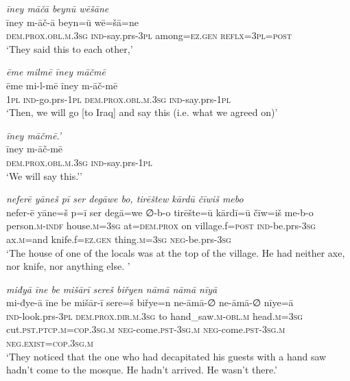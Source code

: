 \ea \label{BP.66}
\textit{īney māčā beynū wēšāne} \\ 
\gll īney m-āč-ā beyn=ū wē=šā=ne \\ 
 \textsc{dem.prox}\textsc{.obl}\textsc{.m}\textsc{.3sg} \textsc{ind-}say.prs\textsc{-3pl} among\textsc{=ez.gen} \textsc{reflx}\textsc{=3pl}\textsc{=\textsc{post}} \\ 
\glt `They said this to each other,'
\z 
 
\ea \label{BP.68}
\textit{ēme milmē īney māčmē} \\ 
\gll ēme mi-l-mē īney m-āč-mē \\ 
 \textsc{1pl} \textsc{ind-}go.prs\textsc{-\textsc{1pl}} \textsc{dem.prox}\textsc{.obl}\textsc{.m}\textsc{.3sg} \textsc{ind-}say.prs\textsc{-\textsc{1pl}} \\ 
\glt `Then, we will go [to Iraq] and say this (i.e. what we agreed on)'
\z 
 
\ea \label{BP.69}
\textit{īney māčmē.’} \\ 
\gll īney m-āč-mē \\ 
 \textsc{dem.prox}\textsc{.obl}\textsc{.m}\textsc{.3sg} \textsc{ind-}say.prs\textsc{-\textsc{1pl}} \\ 
\glt `We will say this.’'
\z 
 
\ea \label{BP.71}
\textit{neferē yāneš pī ser degāwe bo, tirēštew kārdū čīwiš mebo} \\ 
\gll nefer-ē yāne=š p=ī ser degā=we ∅-b-o tirēšte=ū kārdī=ū čīw=iš me-b-o \\ 
 person\textsc{.m}\textsc{-indf} house\textsc{.m}\textsc{=3sg} at=\textsc{dem.prox} on village.f\textsc{=\textsc{post}} \textsc{ind-}be.prs\textsc{-3sg} ax\textsc{.m}=and knife.f\textsc{=ez.gen} thing\textsc{.m}\textsc{=3sg} \textsc{neg-}be.prs\textsc{-3sg} \\ 
\glt `The house of one of the locals was at the top of the village. He had neither axe, nor knife, nor anything else. '
\z 
 
\ea \label{BP.76}
\textit{miđyā īne be mišārī sereš biřyen nāmā nāmā nīyā} \\ 
\gll mi-đye-ā īne be mišār-ī sere=š biřye=n ne-āmā-∅ ne-āmā-∅ nīye=ā \\ 
 \textsc{ind-}look.prs\textsc{-3pl} \textsc{dem.prox}\textsc{.dir}\textsc{.m}\textsc{.3sg} to hand\_saw\textsc{.m}\textsc{-obl}\textsc{.m} head\textsc{.m}\textsc{=3sg} cut\textsc{.pst}\textsc{.ptcp}\textsc{.m}\textsc{=cop}\textsc{.3sg}\textsc{.m} \textsc{neg-}come\textsc{.pst}\textsc{-3sg}\textsc{.m} \textsc{neg-}come\textsc{.pst}\textsc{-3sg}\textsc{.m} \textsc{\textsc{neg.}exist}\textsc{=cop}\textsc{.3sg}\textsc{.m} \\ 
\glt `They noticed that the one who had decapitated his guests with a hand saw hadn’t come to the mosque. He hadn’t arrived. He wasn’t there.'
\z 
 
